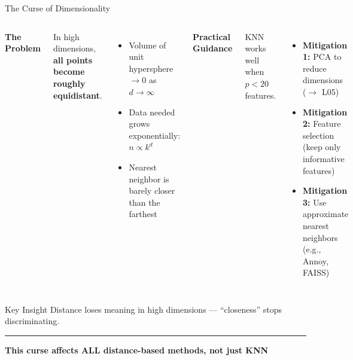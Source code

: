 \documentclass[8pt,aspectratio=169]{beamer}
\newcommand{\bottomnote}[1]{%
\vfill
\vspace{-2mm}
\textcolor{mllavender2}{\rule{\textwidth}{0.4pt}}
\vspace{1mm}
\footnotesize
\textbf{#1}
}
\newenvironment{compactlist}{%
  \begin{itemize}%
    \setlength{\itemsep}{2pt}%
    \setlength{\parskip}{0pt}%
    \setlength{\parsep}{0pt}%
}{%
  \end{itemize}%
}
\newcommand{\highlight}[1]{\textcolor{mlorange}{\textbf{#1}}}
\begin{document}
\begin{frame}[t]{The Curse of Dimensionality}
\begin{columns}[T]
\small
\textbf{The Problem}

\footnotesize
In high dimensions, \highlight{all points become roughly equidistant}.
\begin{compactlist}
\item \footnotesize Volume of unit hypersphere $\to 0$ as $d \to \infty$
\item \footnotesize Data needed grows exponentially: $n \propto k^d$
\item \footnotesize Nearest neighbor is barely closer than the farthest
\end{compactlist}

\small
\textbf{Practical Guidance}

\footnotesize
KNN works well when $p < 20$ features.
\begin{compactlist}
\item \footnotesize \textbf{Mitigation 1:} PCA to reduce dimensions ($\to$ L05)
\item \footnotesize \textbf{Mitigation 2:} Feature selection (keep only informative features)
\item \footnotesize \textbf{Mitigation 3:} Use approximate nearest neighbors (e.g., Annoy, FAISS)
\end{compactlist}
\end{columns}

\vspace{3mm}
\begin{block}{Key Insight}
\footnotesize Distance loses meaning in high dimensions --- ``closeness'' stops discriminating.
\end{block}
\bottomnote{This curse affects ALL distance-based methods, not just KNN}
\end{frame}
\end{document}
